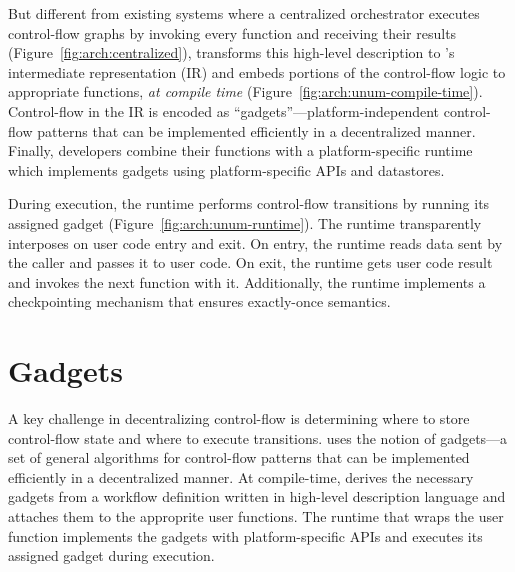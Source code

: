 But different from existing systems where a centralized orchestrator executes
control-flow graphs by invoking every function and receiving their results
(Figure~\ref{fig:arch:centralized}), \name{} transforms this high-level
description to \name{}'s intermediate representation (IR) and embeds portions
of the control-flow logic to appropriate functions, \emph{at compile time}
(Figure~\ref{fig:arch:unum-compile-time}). Control-flow in the IR is encoded
as ``gadgets''---platform-independent control-flow patterns that can be
implemented efficiently in a decentralized manner. Finally, developers combine
their functions with a platform-specific \name{} runtime which implements
gadgets using platform-specific APIs and datastores.

During execution, the \name{} runtime performs control-flow transitions by
running its assigned gadget (Figure~\ref{fig:arch:unum-runtime}). The runtime
transparently interposes on user code entry and exit. On entry, the runtime
reads data sent by the caller and passes it to user code. On exit, the runtime
gets user code result and invokes the next function with it. Additionally, the
runtime implements a checkpointing mechanism that ensures exactly-once
semantics.






\section{Gadgets}\label{sec:gadgets}

A key challenge in decentralizing control-flow is determining where to store
control-flow state and where to execute transitions. \name{} uses the notion
of gadgets---a set of general algorithms for control-flow patterns that can be
implemented efficiently in a decentralized manner. At compile-time,
\name{} derives the necessary gadgets from a workflow definition written in
high-level description language and attaches them to the approprite user
functions. The \name{} runtime that wraps the user function implements the
gadgets with platform-specific APIs and executes its assigned gadget during
execution.

